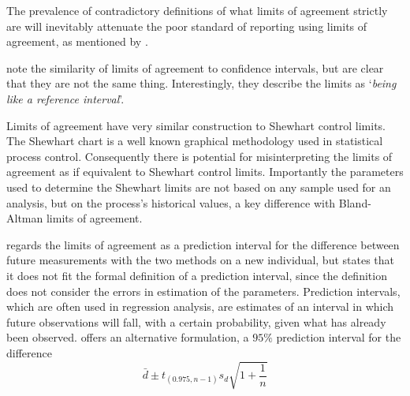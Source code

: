 \documentclass[12pt, a4paper]{report}
\theoremstyle{plain}
\theoremstyle{definition}
\theoremstyle{remark}
\begin{document}
The prevalence of contradictory definitions of what limits of agreement strictly are will inevitably attenuate the poor standard of reporting using limits of agreement, as mentioned by \citet{mantha}.






\citet{BA99} note the similarity of limits of agreement to
confidence intervals, but are clear that they are not the same thing. Interestingly, they describe the limits as `\textit{being like a reference interval}'.

Limits of agreement have very similar construction to Shewhart control limits. The Shewhart chart is a well known graphical
methodology used in statistical process control. Consequently there is potential for misinterpreting the limits of agreement as if equivalent to Shewhart control limits. Importantly the parameters used to determine the Shewhart limits are not based on any sample used for an analysis, but
on the process's historical values, a key difference with
Bland-Altman limits of agreement.

\citet{BXC2008} regards the limits of agreement as a prediction interval for the difference between future measurements with the two methods on a new individual, but states that it does not fit
the formal definition of a prediction interval, since the definition does not consider the errors in estimation of the
parameters. Prediction intervals, which are often used in regression analysis, are estimates of an interval in which future
observations will fall, with a certain probability, given what has already been observed. \citet{BXC2008} offers an alternative formulation, a $95\%$ prediction interval for the difference
\[
\bar{d} \pm t_{(0.975, n-1)}s_{d} \sqrt{1+\frac{1}{n}}
\]
\end{document}
